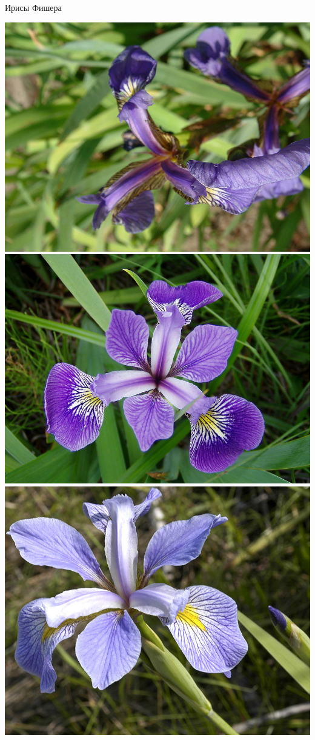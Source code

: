\documentclass[aspectratio=169]{beamer}
\begin{document}
\begin{frame}{Ирисы Фишера}

\begin{center}
\includegraphics[scale=0.1]{images/setosa.jpg} \;
\includegraphics[scale=0.1]{images/versicolor.jpg} \;
\includegraphics[scale=0.416]{images/virginica.jpg}

\end{center}
\end{frame}
\end{document}
